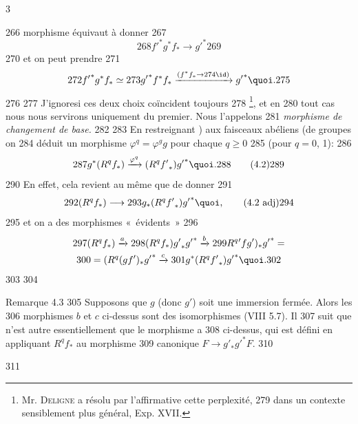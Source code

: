 3	\documentclass[10pt]{../fichiers-configuration-latex/smfart}
\begin{document}
   266	morphisme équivaut à donner
   267	$$
   268	{f'}^{\ast}g^{\ast}f_{\ast}\longrightarrow {g'}^{\ast}
   269	$$
   270	et on peut prendre
   271	$$
   272	{f'}^{\ast}g^{\ast}f_{\ast}\simeq
   273	{g'}^{\ast}f^{\ast}f_{\ast}\xrightarrow{(f^{\ast}f_{\ast}\rightarrow
   274	  \id)} {g'}^{\ast}{\quoi}.
   275	$$
   276	
   277	J'ignore\pageoriginale si ces deux choix coïncident toujours
   278	\footnote[1]{Mr. \textsc{Deligne} a résolu par l'affirmative cette perplexité,
   279	dans un contexte sensiblement plus général, \cf Exp. XVII.}, et en
   280	tout cas nous nous servirons uniquement du premier. Nous l'appelons
   281	\emph{morphisme de changement de base.}
   282	
   283	En restreignant ) aux faisceaux abéliens (\resp de groupes on
   284	déduit un morphisme $\varphi^q=\varphi^g g$ pour chaque $q\geq 0$
   285	(\resp pour $q=0$, 1):
   286	\begin{equation*}
   287	g^{\ast}(R^qf_{\ast})\xrightarrow{\varphi^q}(R^q{f'}_{\ast}){g'}^{\ast}{\quoi}.
   288	\tag{4.2}
   289	\end{equation*}
   290	En effet, cela revient au même que de donner
   291	\begin{equation*}
   292	(R^qf_{\ast})\longrightarrow
   293	  g_{\ast}(R^q{f'}_{\ast}){g'}^{\ast}{\quoi},\tag{4.2 adj}
   294	\end{equation*}\label{4.2 adj}
   295	et on a des morphismes « évidents » 
   296	\begin{gather*}
   297	(R^qf_{\ast})\xrightarrow{a}
   298	  (R^qf_{\ast}){g'}_{\ast}{g'}^{\ast}\xrightarrow{b}
   299	  R^q{'}fg')_{\ast}{g'}^{\ast}=\\
   300	=(R^q(gf')_{\ast}{g'}^{\ast}\xrightarrow{c}
   301	  g^{\ast}(R^q{f'}_{\ast}){g'}^{\ast}{\quoi}.
   302	\end{gather*}
   303	
   304	\begin{enonce*}[remark]{Remarque 4.3}
   305	Supposons que $g$ (donc $g'$) soit une immersion fermée. Alors les
   306	morphismes $b$ et $c$ ci-dessus sont des isomorphismes (VIII 5.7). Il
   307	suit que  n'est autre essentiellement que le morphisme a
   308	ci-dessus, qui est défini en appliquant $R^qf_{\ast}$ au morphisme
   309	canonique $F\rightarrow {g'}_{\ast}{g'}^{\ast}F$.
   310	\end{enonce*}
   311	
\end{document}
